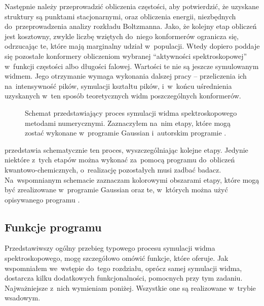Następnie należy przeprowadzić obliczenia częstości, aby potwierdzić, że uzyskane
  struktury są punktami stacjonarnymi, oraz obliczenia energii, niezbędnych do~przeprowadzenia
  analizy rozkładu Boltzmanna.
Jako, że kolejny etap obliczeń jest kosztowny,
  zwykle liczbę wziętych do~niego konformerów ogranicza się, odrzucając te, które mają marginalny
  udział w~populacji.
Wtedy dopiero poddaje się pozostałe konformery obliczeniom wybranej
  \enquote{aktywności spektroskopowej} w~funkcji częstości albo długości falowej.
Wartości te nie są jeszcze symulowanym widmem.
Jego otrzymanie wymaga wykonania dalszej pracy \--- przeliczenia ich na~intensywność pików,
  symulacji kształtu pików, i~w~końcu uśrednienia uzyskanych w~ten sposób teoretycznych widm
  poszczególnych konformerów.

\begin{figure}
  
  \caption{
    Schemat przedstawiający proces symulacji widma spektroskopowego metodami numerycznymi.
    Zaznaczyłem na~nim etapy, które mogą zostać wykonane w~programie Gaussian i~autorskim
      programie \tesliper{}.
  }\label{fig:simulation-flow}
\end{figure}

 przedstawia schematycznie ten proces, wyszczególniając kolejne etapy.
Jedynie niektóre z~tych etapów można wykonać za~pomocą programu do~obliczeń kwantowo-chemicznych,
  o~realizację pozostałych musi zadbać badacz.
Na~wspomnianym schemacie zaznaczam kolorowymi obszarami etapy, które mogą być zrealizowane
  w~programie Gaussian oraz te, w~których można użyć opisywanego programu \tesliper{}.

\subsection{Funkcje programu}\label{essence:features}
Przedstawiwszy ogólny przebieg typowego procesu symulacji widma spektroskopowego,
  mogę szczegółowo omówić funkcje, które \tesliper{} oferuje.
Jak wspomniałem we~wstępie do~tego rozdziału, oprócz samej symulacji widma, \tesliper{}
  dostarcza kilku dodatkowych funkcjonalności, pomocnych przy tym zadaniu.
Najważniejsze z~nich wymieniam poniżej.
Wszystkie one są realizowane w~trybie wsadowym.  

